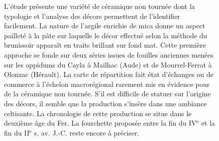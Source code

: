 \begin{figure}
{{          L'étude présente une variété de céramique non tournée dont la
          typologie et l'analyse des décors permettent de l'identifier
          facilement. La nature de l'argile enrichie de mica donne un aspect
          pailleté à la pâte sur laquelle le décor effectué selon la méthode du
          brunissoir apparaît en traits brillant sur fond mat. Cette première
          approche se fonde sur deux séries issues de fouilles anciennes menées
          sur les oppidums du Cayla à Mailhac (Aude) et de Mourrel-Ferrat à
          Olonzac (Hérault). La carte de répartition fait état d'échanges ou de
          commerce à l'échelon macrorégional rarement mis en évidence pour de la
          céramique non tournée. S'il est difficile de statuer sur l'origine des
          décors, il semble que la production s'insère dans une ambiance
          celtisante. La chronologie de cette production se situe dans le
          deuxième âge du Fer. La fourchette proposée entre la fin du
          IV$^\text{e}$ et la fin du II$^\text{e}$ s. av. J.-C. reste encore à
          préciser.\\

}}
\end{figure}
